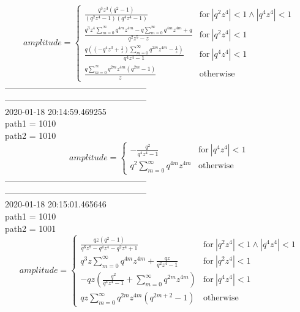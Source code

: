 $$amplitude = \begin{cases} \frac{q^{3} z^{3} \left(q^{2} - 1\right)}{\left(q^{2} z^{4} - 1\right) \left(q^{4} z^{4} - 1\right)} & \text{for}\: \left|{q^{2} z^{4}}\right| < 1 \wedge \left|{q^{4} z^{4}}\right| < 1 \\\frac{q^{3} z^{4} \sum_{m=0}^{\infty} q^{4 m} z^{4 m} - q \sum_{m=0}^{\infty} q^{4 m} z^{4 m} + q}{q^{2} z^{5} - z} & \text{for}\: \left|{q^{2} z^{4}}\right| < 1 \\\frac{q \left(\left(- q^{4} z^{3} + \frac{1}{z}\right) \sum_{m=0}^{\infty} q^{2 m} z^{4 m} - \frac{1}{z}\right)}{q^{4} z^{4} - 1} & \text{for}\: \left|{q^{4} z^{4}}\right| < 1 \\\frac{q \sum_{m=0}^{\infty} q^{2 m} z^{4 m} \left(q^{2 m} - 1\right)}{z} & \text{otherwise} \end{cases}$$
--------------------------------------------------\\
--------------------------------------------------\\
2020-01-18 20:14:59.469255\\
path1 = 1010\\
path2 = 1010\\
$$amplitude = \begin{cases} - \frac{q^{2}}{q^{4} z^{4} - 1} & \text{for}\: \left|{q^{4} z^{4}}\right| < 1 \\q^{2} \sum_{m=0}^{\infty} q^{4 m} z^{4 m} & \text{otherwise} \end{cases}$$
--------------------------------------------------\\
--------------------------------------------------\\
2020-01-18 20:15:01.465646\\
path1 = 1010\\
path2 = 1001\\
$$amplitude = \begin{cases} \frac{q z \left(q^{2} - 1\right)}{q^{6} z^{8} - q^{4} z^{4} - q^{2} z^{4} + 1} & \text{for}\: \left|{q^{2} z^{4}}\right| < 1 \wedge \left|{q^{4} z^{4}}\right| < 1 \\q^{3} z \sum_{m=0}^{\infty} q^{4 m} z^{4 m} + \frac{q z}{q^{2} z^{4} - 1} & \text{for}\: \left|{q^{2} z^{4}}\right| < 1 \\- q z \left(\frac{q^{2}}{q^{4} z^{4} - 1} + \sum_{m=0}^{\infty} q^{2 m} z^{4 m}\right) & \text{for}\: \left|{q^{4} z^{4}}\right| < 1 \\q z \sum_{m=0}^{\infty} q^{2 m} z^{4 m} \left(q^{2 m + 2} - 1\right) & \text{otherwise} \end{cases}$$
